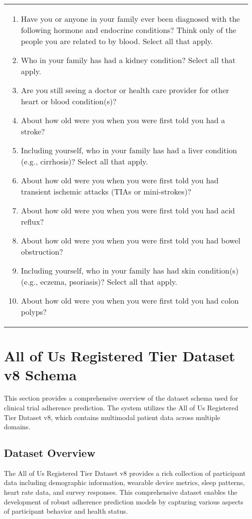 \documentclass[12pt]{article}
\begin{document}
\begin{longtable}{p{}}
\begin{enumerate}
\item Have you or anyone in your family ever been diagnosed with the following hormone and endocrine conditions? Think only of the people you are related to by blood. Select all that apply.
\item Who in your family has had a kidney condition? Select all that apply.
\item Are you still seeing a doctor or health care provider for other heart or blood condition(s)?
\item About how old were you when you were first told you had a stroke?
\item Including yourself, who in your family has had a liver condition (e.g., cirrhosis)? Select all that apply.
\item About how old were you when you were first told you had transient ischemic attacks (TIAs or mini-strokes)?
\item About how old were you when you were first told you had acid reflux?
\item About how old were you when you were first told you had bowel obstruction?
\item Including yourself, who in your family has had skin condition(s) (e.g., eczema, psoriasis)? Select all that apply.
\item About how old were you when you were first told you had colon polyps?
\end{enumerate}
\end{longtable}

\section{All of Us Registered Tier Dataset v8 Schema}

This section provides a comprehensive overview of the dataset schema used for clinical trial adherence prediction. The system utilizes the All of Us Registered Tier Dataset v8, which contains multimodal patient data across multiple domains.

\subsection{Dataset Overview}
The All of Us Registered Tier Dataset v8 provides a rich collection of participant data including demographic information, wearable device metrics, sleep patterns, heart rate data, and survey responses. This comprehensive dataset enables the development of robust adherence prediction models by capturing various aspects of participant behavior and health status.
\end{document}
